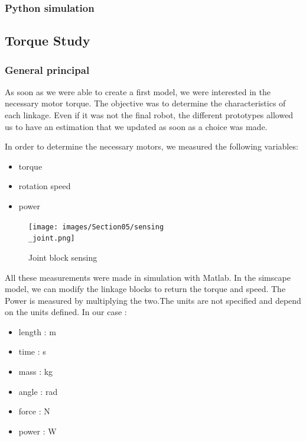 \subsubsection{Python simulation}

\subsection{Torque Study}
\subsubsection{General principal}

\hspace{\parindent} As soon as we were able to create a first model, we were interested in the necessary motor torque. The objective was to determine the characteristics of each linkage. Even if it was not the final robot, the different prototypes allowed us to have an estimation that we updated as soon as a choice was made. 

\bigbreak
In order to determine the necessary motors, we measured the following variables:
\begin{multicols}{3}
    \begin{itemize}[noitemsep]
        \item torque
        \item rotation speed
        \item power
    \end{itemize}
\end{multicols}

\bigbreak
\begin{figure}[ht]
    \centering
    \texttt{[image: images/Section05/sensing\\\_joint.png]}
    \caption{Joint block sensing}
    \label{fig:mesh15}
\end{figure}
\FloatBarrier

\bigbreak
All these measurements were made in simulation with Matlab. In the simscape model, we can modify the linkage blocks to return the torque and speed. The Power is measured by multiplying the two.The units are not specified and depend on the units defined. In our case : 
\begin{multicols}{2}
    \begin{itemize}[noitemsep]
        \item length : m
        \item time : s
        \item mass : kg
        \item angle : rad
        \item force : N
        \item power : W
    \end{itemize}
\end{multicols}

